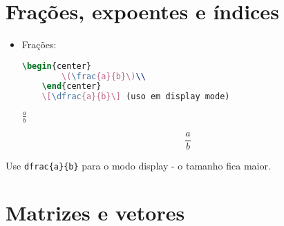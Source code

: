 \section{Frações, expoentes e índices}

\begin{itemize}
    \item Frações:
    \begin{lstlisting}[language=tex, caption=Frações em LaTeX]
    \begin{center}
        \(\frac{a}{b}\)\\
    \end{center}
    \[\dfrac{a}{b}\] (uso em display mode)
    \end{lstlisting}
    \begin{center}
        \(\frac{a}{b}\)\\
    \end{center}
    \[\dfrac{a}{b}\]
\end{itemize}

Use \verb|dfrac{a}{b}| para o modo display - o tamanho fica maior.

\section{Matrizes e vetores}


